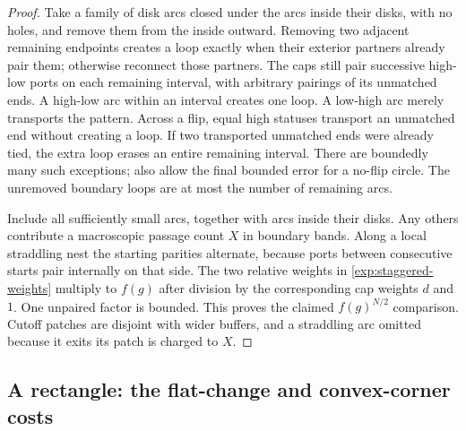 \begin{proof}
Take a family of disk arcs closed under the arcs inside their disks,
with no holes, and remove them from the inside outward. Removing two
adjacent remaining endpoints creates a loop exactly when their exterior
partners already pair them; otherwise reconnect those partners.
The caps still pair successive high-low ports on each remaining
interval, with arbitrary pairings of its unmatched ends. A high-low arc
within an interval creates one loop. A low-high arc merely transports
the pattern. Across a flip, equal high statuses transport an unmatched
end without creating a loop. If two transported unmatched ends were
already tied, the extra loop erases an entire remaining interval. There
are boundedly many such exceptions; also allow the final bounded error
for a no-flip circle. The unremoved boundary loops are at most the number
of remaining arcs.

Include all sufficiently small arcs, together with arcs inside their
disks. Any others contribute a macroscopic passage count $X$ in boundary
bands. Along a local straddling nest the starting parities alternate,
because ports between consecutive starts pair internally on that side.
The two relative weights in \eqref{exp:staggered-weights} multiply to
$f(g)$ after division by the corresponding cap weights $d$ and $1$.
One unpaired factor is bounded. This proves the claimed $f(g)^{N/2}$
comparison. Cutoff patches are disjoint with wider buffers, and a
straddling arc omitted because it exits its patch is charged to $X$.
\end{proof}

\subsection{A rectangle: the flat-change and convex-corner costs}

